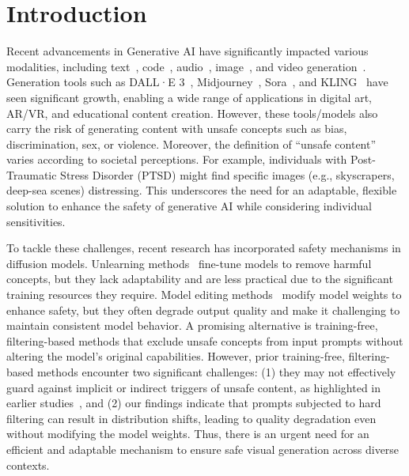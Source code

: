 

\section{Introduction}
Recent advancements in Generative AI have significantly impacted various modalities, including text~\citep{brown2020language,dubey2024llama}, code~\citep{chen2021evaluating,liu2024exploring,zhong2024debug}, audio~\citep{kreuk2022audiogen, copet2024simple}, image~\citep{podell2023sdxl,tian2024visual}, and video generation~\citep{ho2022imagen,kondratyuk2023videopoet,yoon2024raccoon,yang2024cogvideox}. 
Generation tools such as DALL·E 3~\citep{dalle3}, Midjourney~\citep{midjourney}, Sora~\citep{2024sora}, and KLING~\citep{kling} have seen significant growth, enabling a wide range of applications in digital art, AR/VR, and educational content creation.
However, these tools/models also carry the risk of generating content with unsafe concepts such as bias, discrimination, sex, or violence. 
Moreover, the definition of ``unsafe content'' varies according to societal perceptions. For example, individuals with Post-Traumatic Stress Disorder (PTSD) might find specific images (e.g., skyscrapers, deep-sea scenes) distressing. This underscores the need for an adaptable, flexible solution to enhance the safety of generative AI while considering individual sensitivities.

To tackle these challenges, recent research has incorporated safety mechanisms in diffusion models. 
Unlearning methods~\citep{zhang2023forget,huang2023receler,park2024direct, wu2024unlearning} fine-tune models to remove harmful concepts, but they lack adaptability and are less practical due to the significant training resources they require. Model editing methods~\citep{orgad2023editing,gandikota2024unified,xiong2024editing} modify model weights to enhance safety, but they often degrade output quality and make it challenging to maintain consistent model behavior.
A promising alternative is training-free, filtering-based methods that exclude unsafe concepts from input prompts without altering the model's original capabilities.
However, prior training-free, filtering-based methods encounter two significant challenges: (1) they may not effectively guard against implicit or indirect triggers of unsafe content, as highlighted in earlier studies~\citep{deng2023divide}, and (2) our findings indicate that prompts subjected to hard filtering can result in distribution shifts, leading to quality degradation even without modifying the model weights. Thus, there is an urgent need for an efficient and adaptable mechanism to ensure safe visual generation across diverse contexts.


